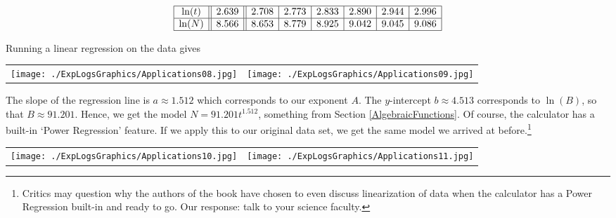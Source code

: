 \[\begin{array}{|c||c||c|c|c|c|c|c|} \hline

\ln(t) & 2.639 & 2.708 & 2.773 & 2.833 & 2.890 & 2.944 & 2.996  \\ \hline 

\ln(N) & 8.566 & 8.653 & 8.779 & 8.925 & 9.042 & 9.045 & 9.086    \\ \hline \end{array} \]

Running a linear regression on the data gives

\begin{center}

\begin{tabular}{cc}

\texttt{[image: ./ExpLogsGraphics/Applications08.jpg]} &

\hspace{0.75in} \texttt{[image: ./ExpLogsGraphics/Applications09.jpg]} \\

\end{tabular}

\end{center}

The slope of the regression line is $a \approx 1.512$ which corresponds to our exponent $A$.  The $y$-intercept $b \approx 4.513$ corresponds to $\ln(B)$, so that $B \approx 91.201$.  Hence, we get the model $N = 91.201 t^{1.512}$, something from Section \ref{AlgebraicFunctions}.  Of course, the calculator has a built-in `Power Regression' feature.  If we apply this to our original data set, we get the same model we arrived at before.\footnote{Critics may question why the authors of the book have chosen to even discuss linearization of data when the calculator has a Power Regression built-in and ready to go.  Our response:  talk to your science faculty.}


\begin{center}

\begin{tabular}{cc}

\texttt{[image: ./ExpLogsGraphics/Applications10.jpg]} &

\hspace{0.75in} \texttt{[image: ./ExpLogsGraphics/Applications11.jpg]} \\

\end{tabular}

\end{center}


